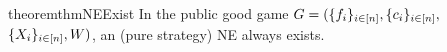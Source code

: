 \begin{restatable}{theorem}{thmNEExist}
\label{thm:NE:exist}
    In the public good game $G = (\{f_i\}_{i\in[n]}, \{c_i\}_{i\in[n]},$ $\{X_i\}_{i\in[n]}, W)$, an (pure strategy) NE always exists.
\end{restatable}